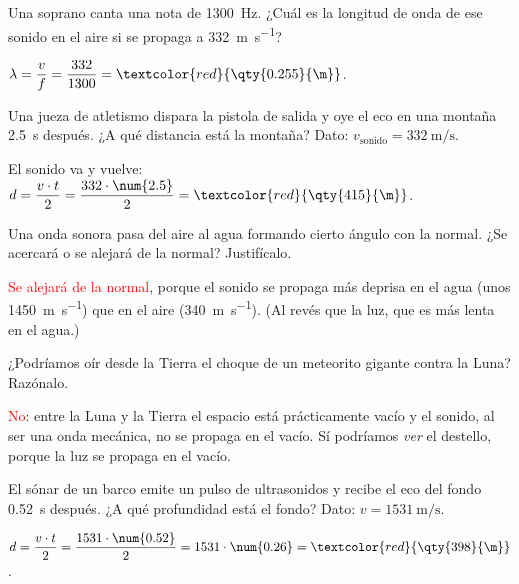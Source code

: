 \begin{exercise}
    Una soprano canta una nota de \qty{1300}{\hertz}. ¿Cuál es la longitud de onda de ese sonido en el aire si se propaga a \qty{332}{\m\per\s}?
    \begin{solu}
        \(\lambda = \dfrac{v}{f} = \dfrac{332}{1300} = \textcolor{red}{\qty{0.255}{\m}}\).
    \end{solu}
\end{exercise}

\begin{exercise}
    Una jueza de atletismo dispara la pistola de salida y oye el eco en una montaña \qty{2.5}{\s} después. ¿A qué distancia está la montaña? Dato: \(v_{\text{sonido}} = \qty{332}{\m\per\s}\).
    \begin{solu}
        El sonido va y vuelve: \(d = \dfrac{v \cdot t}{2} = \dfrac{332 \cdot \num{2.5}}{2} = \textcolor{red}{\qty{415}{\m}}\).
    \end{solu}
\end{exercise}

\begin{exercise}
    Una onda sonora pasa del aire al agua formando cierto ángulo con la normal. ¿Se acercará o se alejará de la normal? Justifícalo.
    \begin{solu}
        \textcolor{red}{Se alejará de la normal}, porque el sonido se propaga más deprisa en el agua (unos \qty{1450}{\m\per\s}) que en el aire (\qty{340}{\m\per\s}). (Al revés que la luz, que es más lenta en el agua.)
    \end{solu}
\end{exercise}

\begin{exercise}
    ¿Podríamos oír desde la Tierra el choque de un meteorito gigante contra la Luna? Razónalo.
    \begin{solu}
        \textcolor{red}{No}: entre la Luna y la Tierra el espacio está prácticamente vacío y el sonido, al ser una onda mecánica, no se propaga en el vacío. Sí podríamos \emph{ver} el destello, porque la luz se propaga en el vacío.
    \end{solu}
\end{exercise}

\begin{exercise}
    El sónar de un barco emite un pulso de ultrasonidos y recibe el eco del fondo \qty{0.52}{\s} después. ¿A qué profundidad está el fondo? Dato: \(v = \qty{1531}{\m\per\s}\).
    \begin{solu}
        \(d = \dfrac{v \cdot t}{2} = \dfrac{1531 \cdot \num{0.52}}{2} = 1531 \cdot \num{0.26} = \textcolor{red}{\qty{398}{\m}}\).
    \end{solu}
\end{exercise}

